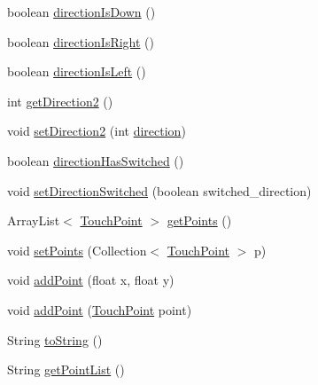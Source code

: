 \begin{DoxyCompactItemize}
boolean \hyperlink{classch_1_1zhaw_1_1ba10__bsha__1_1_1service_1_1MicroGesture_af20c9c32f3b4f9924bffffc78b7697e6}{directionIsDown} ()
\item 
boolean \hyperlink{classch_1_1zhaw_1_1ba10__bsha__1_1_1service_1_1MicroGesture_a265dca7b768b336a90d0177b1a299949}{directionIsRight} ()
\item 
boolean \hyperlink{classch_1_1zhaw_1_1ba10__bsha__1_1_1service_1_1MicroGesture_a4d4320e029aef962577b2ccc85f2ee57}{directionIsLeft} ()
\item 
int \hyperlink{classch_1_1zhaw_1_1ba10__bsha__1_1_1service_1_1MicroGesture_a2e7fddf59ece8d2edc92d09cb739b98f}{getDirection2} ()
\item 
void \hyperlink{classch_1_1zhaw_1_1ba10__bsha__1_1_1service_1_1MicroGesture_a0599eb1f4978635f7eed3fa1bb9961dc}{setDirection2} (int \hyperlink{classch_1_1zhaw_1_1ba10__bsha__1_1_1service_1_1MicroGesture_a99f2fb0a7f8e2667b5fb8043dde76ff8}{direction})
\item 
boolean \hyperlink{classch_1_1zhaw_1_1ba10__bsha__1_1_1service_1_1MicroGesture_a6ac77efbcacfb83da624687c2362b2a9}{directionHasSwitched} ()
\item 
void \hyperlink{classch_1_1zhaw_1_1ba10__bsha__1_1_1service_1_1MicroGesture_ad4647452ba6cbeca4766bf81dfa0fc7d}{setDirectionSwitched} (boolean switched\_\-direction)
\item 
ArrayList$<$ \hyperlink{classch_1_1zhaw_1_1ba10__bsha__1_1_1TouchPoint}{TouchPoint} $>$ \hyperlink{classch_1_1zhaw_1_1ba10__bsha__1_1_1service_1_1MicroGesture_a919d77a82938af887cff893c7b0f41e5}{getPoints} ()
\item 
void \hyperlink{classch_1_1zhaw_1_1ba10__bsha__1_1_1service_1_1MicroGesture_a71ef1e00c42a00874e551707d73de579}{setPoints} (Collection$<$ \hyperlink{classch_1_1zhaw_1_1ba10__bsha__1_1_1TouchPoint}{TouchPoint} $>$ p)
\item 
void \hyperlink{classch_1_1zhaw_1_1ba10__bsha__1_1_1service_1_1MicroGesture_a328c48ead9f14d52e747a54a970fdd9e}{addPoint} (float x, float y)
\item 
void \hyperlink{classch_1_1zhaw_1_1ba10__bsha__1_1_1service_1_1MicroGesture_a3a553d36d664db7199804f09f08d28cf}{addPoint} (\hyperlink{classch_1_1zhaw_1_1ba10__bsha__1_1_1TouchPoint}{TouchPoint} point)
\item 
String \hyperlink{classch_1_1zhaw_1_1ba10__bsha__1_1_1service_1_1MicroGesture_adbf2189c0f8d6737493978f765e73fe0}{toString} ()
\item 
String \hyperlink{classch_1_1zhaw_1_1ba10__bsha__1_1_1service_1_1MicroGesture_a541771c10aeb3dcabe1d310a26ef1c2b}{getPointList} ()
\end{DoxyCompactItemize}

